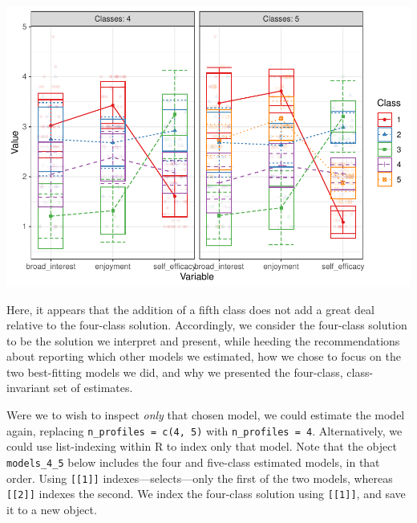 \documentclass[man]{apa6}
\newenvironment{Shaded}{\begin{snugshade}}{\end{snugshade}}
\newcommand{\DataTypeTok}[1]{\textcolor[rgb]{0.13,0.29,0.53}{#1}}
\newcommand{\DecValTok}[1]{\textcolor[rgb]{0.00,0.00,0.81}{#1}}
\newcommand{\KeywordTok}[1]{\textcolor[rgb]{0.13,0.29,0.53}{\textbf{#1}}}
\newcommand{\NormalTok}[1]{#1}
\newcommand{\OperatorTok}[1]{\textcolor[rgb]{0.81,0.36,0.00}{\textbf{#1}}}
\newcommand{\OtherTok}[1]{\textcolor[rgb]{0.56,0.35,0.01}{#1}}
\newcommand{\StringTok}[1]{\textcolor[rgb]{0.31,0.60,0.02}{#1}}
\begin{document}
\begin{Shaded}
\end{Shaded}

\includegraphics{paper_files/figure-latex/unnamed-chunk-8-1.pdf}

Here, it appears that the addition of a fifth class does not add a great deal relative to the four-class solution. Accordingly, we consider the four-class solution to be the solution we interpret and present, while heeding the recommendations about reporting which other models we estimated, how we chose to focus on the two best-fitting models we did, and why we presented the four-class, class-invariant set of estimates.

Were we to wish to inspect \emph{only} that chosen model, we could estimate the model again, replacing \texttt{n\_profiles\ =\ c(4,\ 5)} with \texttt{n\_profiles\ =\ 4}. Alternatively, we could use list-indexing within R to index only that model. Note that the object \texttt{models\_4\_5} below includes the four and five-class estimated models, in that order. Using \texttt{{[}{[}1{]}{]}} indexes---selects---only the first of the two models, whereas \texttt{{[}{[}2{]}{]}} indexes the second. We index the four-class solution using \texttt{{[}{[}1{]}{]}}, and save it to a new object.
\end{document}
